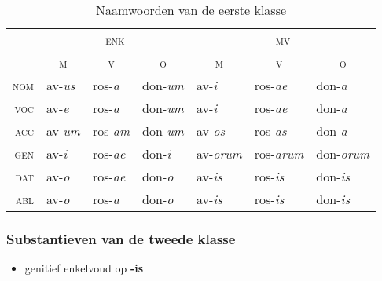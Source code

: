 \documentclass[12pt,a4paper]{article}
\begin{document}
\begin{table}[H]
\centering
\begin{tabular}{ r | l l l | l l l }
\toprule
 & \multicolumn{3}{c|}{\textsc{enk}} & \multicolumn{3}{c}{\textsc{mv}} \\
 & \multicolumn{1}{c}{\textsc{m}} & \multicolumn{1}{c}{\textsc{v}} & \multicolumn{1}{c|}{\textsc{o}} & \multicolumn{1}{c}{\textsc{m}} & \multicolumn{1}{c}{\textsc{v}} & \multicolumn{1}{c}{\textsc{o}} \\ 
\midrule
\textsc{nom} & av-\emph{us} & ros-\emph{a}  & don-\emph{um} & av-\emph{i}    & ros-\emph{ae}   & don-\emph{a} \\
\textsc{voc} & av-\emph{e}  & ros-\emph{a}  & don-\emph{um} & av-\emph{i}    & ros-\emph{ae}   & don-\emph{a} \\
\textsc{acc} & av-\emph{um} & ros-\emph{am} & don-\emph{um} & av-\emph{os}   & ros-\emph{as}   & don-\emph{a} \\
\textsc{gen} & av-\emph{i}  & ros-\emph{ae} & don-\emph{i}  & av-\emph{orum} & ros-\emph{arum} & don-\emph{orum} \\
\textsc{dat} & av-\emph{o}  & ros-\emph{ae} & don-\emph{o}  & av-\emph{is}   & ros-\emph{is}   & don-\emph{is} \\
\textsc{abl} & av-\emph{o}  & ros-\emph{a} & don-\emph{o} & av-\emph{is} & ros-\emph{is} & don-\emph{is} \\
\bottomrule
\end{tabular}
\caption{Naamwoorden van de eerste klasse}
\label{tab:nw1}
\end{table}

\subsubsection{Substantieven van de tweede klasse}
\begin{itemize}
    \item genitief enkelvoud op \textbf{-is}
\end{itemize}
\end{document}
